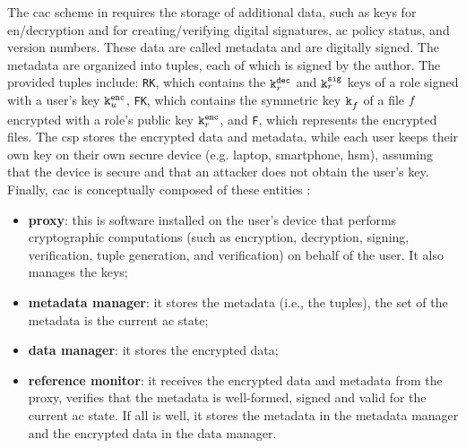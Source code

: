 The \gls{cac} scheme in \cite{cac} requires the storage of additional data, such as keys for en/decryption and for creating/verifying digital signatures, \gls{ac} policy status, and version numbers. These data are called metadata and are digitally signed. The metadata are organized into tuples, each of which is signed by the author. The provided tuples include: \texttt{RK}, which contains the \( \mathtt{k}^{\mathtt{dec}}_{r} \) and \( \mathtt{k}^{\mathtt{sig}}_{r} \) keys of a role signed with a user's key \( \mathtt{k}^{\mathtt{enc}}_{u} \), \texttt{FK}, which contains the symmetric key \( \mathtt{k}^{}_{f} \) of a file \( f \) encrypted with a role's public key \( \mathtt{k}^{\mathtt{enc}}_{r} \), and \texttt{F}, which represents the encrypted files. The \gls{csp} stores the encrypted data and metadata, while each user keeps their own key on their own secure device (e.g. laptop, smartphone, \gls{hsm}), assuming that the device is secure and that an attacker does not obtain the user's key.
%
%
Finally, \gls{cac} is conceptually composed of these entities \cite{berlato_formal_2021}:
\begin{itemize}
	\item \textbf{proxy}: this is software installed on the user's device that performs cryptographic computations (such as encryption, decryption, signing, verification, tuple generation, and verification) on behalf of the user. It also manages the keys;
	\item \textbf{metadata manager}: it stores the metadata (i.e., the tuples), the set of the metadata is the current \gls{ac} state;
	\item \textbf{data manager}: it stores the encrypted data;
	\item \textbf{reference monitor}: it receives the encrypted data and metadata from the proxy, verifies that the metadata is well-formed, signed and valid for the current \gls{ac} state. If all is well, it stores the metadata in the metadata manager and the encrypted data in the data manager.
\end{itemize}
